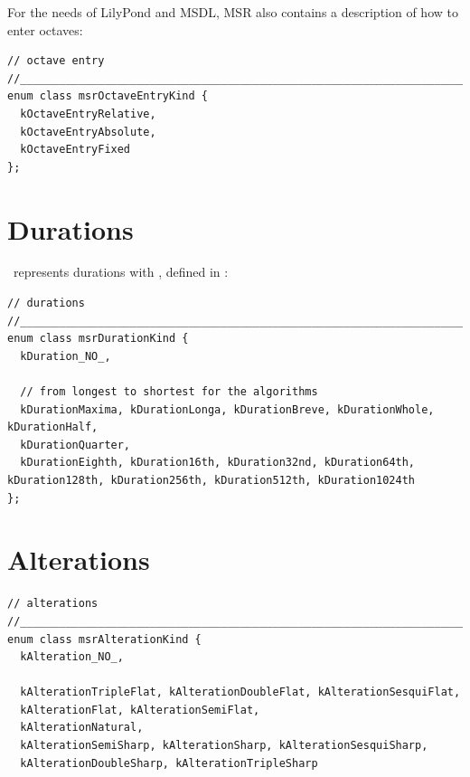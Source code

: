 For the needs of LilyPond and MSDL, MSR also contains a description of how to enter octaves:
\begin{lstlisting}[language=CPlusPlus]
// octave entry
//______________________________________________________________________________
enum class msrOctaveEntryKind {
  kOctaveEntryRelative,
  kOctaveEntryAbsolute,
  kOctaveEntryFixed
};
\end{lstlisting}


\section{Durations}\label{Durations}

\mf\ represents durations with , defined in :
\begin{lstlisting}[language=CPlusPlus]
// durations
//______________________________________________________________________________
enum class msrDurationKind {
  kDuration_NO_,

  // from longest to shortest for the algorithms
  kDurationMaxima, kDurationLonga, kDurationBreve, kDurationWhole, kDurationHalf,
  kDurationQuarter,
  kDurationEighth, kDuration16th, kDuration32nd, kDuration64th, kDuration128th, kDuration256th, kDuration512th, kDuration1024th
};
\end{lstlisting}

\section{Alterations}\label{Alterations}

\begin{lstlisting}[language=CPlusPlus]
// alterations
//______________________________________________________________________________
enum class msrAlterationKind {
  kAlteration_NO_,

  kAlterationTripleFlat, kAlterationDoubleFlat, kAlterationSesquiFlat,
  kAlterationFlat, kAlterationSemiFlat,
  kAlterationNatural,
  kAlterationSemiSharp, kAlterationSharp, kAlterationSesquiSharp,
  kAlterationDoubleSharp, kAlterationTripleSharp
\end{lstlisting}


